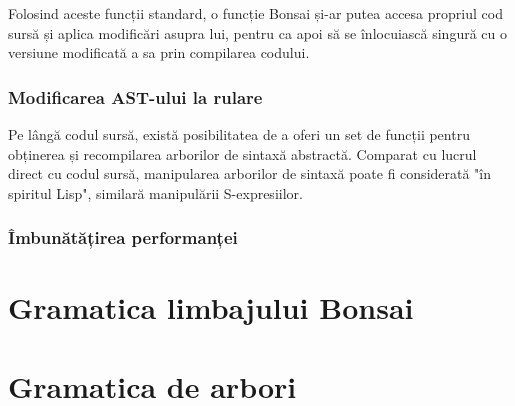 \documentclass[12pt,a4paper]{memoir}
\begin{document}
Folosind aceste funcții standard, o funcție Bonsai și-ar putea accesa propriul cod sursă și aplica modificări asupra lui, pentru ca apoi să se înlocuiască singură cu o versiune modificată a sa prin compilarea codului.

\subsection{Modificarea AST-ului la rulare}

Pe lângă codul sursă, există posibilitatea de a oferi un set de funcții pentru obținerea și recompilarea arborilor de sintaxă abstractă. Comparat cu lucrul direct cu codul sursă, manipularea arborilor de sintaxă poate fi considerată "în spiritul Lisp", similară manipulării S-expresiilor.


\subsection{Îmbunătățirea performanței}



\begin{appendices}


\chapter{Gramatica limbajului Bonsai}
\label{app:grammar}

\chapter{Gramatica de arbori}
\label{app:tree_grammar}

\end{appendices}


{}
\end{document}
